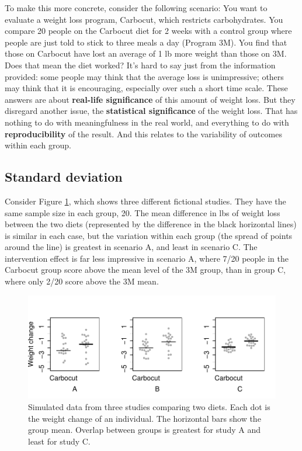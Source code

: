 \documentclass{krantz}
\begin{document}
To make this more concrete, consider the following scenario: You want to evaluate a weight loss program, Carbocut, which restricts carbohydrates. You compare 20 people on the Carbocut diet for 2 weeks with a control group where people are just told to stick to three meals a day (Program 3M). You find that those on Carbocut have lost an average of 1 lb more weight than those on 3M. Does that mean the diet worked? It's hard to say just from the information provided: some people may think that the average loss is unimpressive; others may think that it is encouraging, especially over such a short time scale. These answers are about \textbf{real-life significance} of this amount of weight loss. But they disregard another issue, the \textbf{statistical significance} of the weight loss. That has nothing to do with meaningfulness in the real world, and everything to do with \textbf{reproducibility} of the result. And this relates to the variability of outcomes within each group.

\hypertarget{standard-deviation}{%
\subsection{Standard deviation}\label{standard-deviation}}

Consider Figure \ref{fig:demo-variation}, which shows three different fictional studies. They have the same sample size in each group, 20. The mean difference in lbs of weight loss between the two diets (represented by the difference in the black horizontal lines) is similar in each case, but the variation within each group (the spread of points around the line) is greatest in scenario A, and least in scenario C. The intervention effect is far less impressive in scenario A, where 7/20 people in the Carbocut group score above the mean level of the 3M group, than in group C, where only 2/20 score above the 3M mean.

\begin{figure}
\includegraphics[width=0.9\linewidth]{images_bw/demo-variation} \caption{Simulated data from three studies comparing two diets. Each dot is the weight change of an individual. The horizontal bars show the group mean.  Overlap between groups is greatest for study A and least for study C.}\label{fig:demo-variation}
\end{figure}
\end{document}
